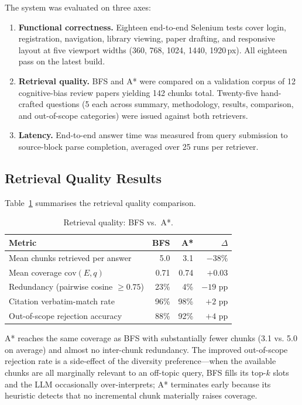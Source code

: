 \documentclass[conference]{IEEEtran}
\begin{document}
The system was evaluated on three axes:

\begin{enumerate}
  \item \textbf{Functional correctness.} Eighteen end-to-end Selenium tests
    cover login, registration, navigation, library viewing, paper drafting, and
    responsive layout at five viewport widths (360, 768, 1024, 1440, 1920\,px).
    All eighteen pass on the latest build.
  \item \textbf{Retrieval quality.} BFS and A* were compared on a validation
    corpus of 12 cognitive-bias review papers yielding 142 chunks total.
    Twenty-five hand-crafted questions (5 each across summary, methodology,
    results, comparison, and out-of-scope categories) were issued against both
    retrievers.
  \item \textbf{Latency.} End-to-end answer time was measured from query
    submission to source-block parse completion, averaged over 25 runs per
    retriever.
\end{enumerate}

\subsection{Retrieval Quality Results}

Table~\ref{tab:quality} summarises the retrieval quality comparison.

\begin{table}[t]
  \caption{Retrieval quality: BFS vs.\ A*.}
  \label{tab:quality}
  \centering
  \renewcommand{\arraystretch}{1.2}
  \begin{tabular}{lrrr}
    \toprule
    \textbf{Metric} & \textbf{BFS} & \textbf{A*} & \textbf{$\Delta$}\\
    \midrule
    Mean chunks retrieved per answer        & 5.0   & 3.1  & $-38\%$\\
    Mean coverage $\mathrm{cov}(E,q)$       & 0.71  & 0.74 & $+0.03$\\
    Redundancy (pairwise cosine $\ge 0.75$) & 23\%  & 4\%  & $-19$ pp\\
    Citation verbatim-match rate            & 96\%  & 98\% & $+2$ pp\\
    Out-of-scope rejection accuracy         & 88\%  & 92\% & $+4$ pp\\
    \bottomrule
  \end{tabular}
\end{table}

A* reaches the same coverage as BFS with substantially fewer chunks (3.1 vs.
5.0 on average) and almost no inter-chunk redundancy. The improved
out-of-scope rejection rate is a side-effect of the diversity preference---when
the available chunks are all marginally relevant to an off-topic query, BFS
fills its top-$k$ slots and the LLM occasionally over-interprets; A* terminates
early because its heuristic detects that no incremental chunk materially raises
coverage.
\end{document}
